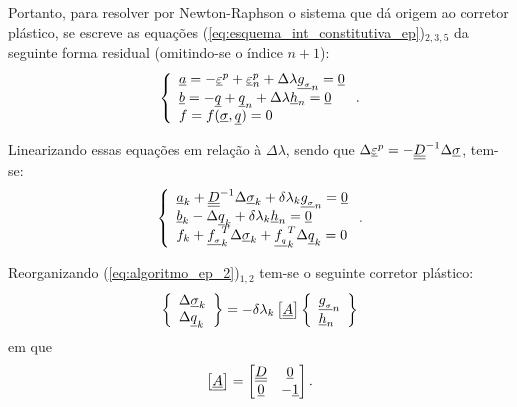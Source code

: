 Portanto, para resolver por Newton-Raphson o sistema que dá origem ao corretor plástico, se escreve as equações (\ref{eq:esquema_int_constitutiva_ep})$_{2,3,5}$ da seguinte forma residual (omitindo-se o índice $n+1$):
\begin{equation}
	\label{eq:algoritmo_ep_1}
	\left\{
	\begin{array}{lcl}
		\underline{a} = -\underline{\varepsilon}^p + \underline{\varepsilon}_n^p + \Delta \lambda \underline{g_{_\sigma}}_n = \underline{0}	\\
		\underline{b} = -\underline q + \underline q_n + \Delta\lambda\underline h_n = \underline{0} \\
		f = f(\underline \sigma,\underline q) = 0
	\end{array}
	\right..
\end{equation}

Linearizando essas equações em relação à $\Delta \lambda$, sendo que $\Delta \underline{\varepsilon}^p = - \underline{\underline D}^{-1}\Delta\underline \sigma$, tem-se:
\begin{equation}
	\label{eq:algoritmo_ep_2}
	\left\{
	\begin{array}{lcl}
		\underline{a}_k + \underline{\underline D}^{-1}\Delta\underline \sigma_k + \delta \lambda_k \underline{g_{_\sigma}}_n = \underline{0} \\
		\underline{b}_k - \Delta \underline q_k + \delta \lambda_k \underline h_n = \underline{0} \\
		f_k + \underline{f_{_\sigma}}_k^T\Delta\underline \sigma_k + \underline{f_{_q}}_k^T \Delta \underline q_k = 0
	\end{array}
	\right..
\end{equation}

Reorganizando (\ref{eq:algoritmo_ep_2})$_{1,2}$ tem-se o seguinte corretor plástico:
\begin{equation}
	\label{eq:algoritmo_ep_3}
	\left\{
	\begin{array}{lcl}
		\Delta \underline \sigma_k \\
		\Delta \underline q_k
	\end{array}
	\right\} = -\delta\lambda_k \left[ \underline{\underline A} \right]
	\left\{	
	\begin{array}{lcl}
		\underline{g_{_\sigma}}_n \\
		\underline h_n
	\end{array}
	\right\}
\end{equation}
em que
\begin{equation}
	\label{eq:Ak}
	\left[ \underline{\underline A} \right] =
	\begin{bmatrix}
		\underline{\underline D} & \underline{0} \\
		\underline{0} & -\underline{1}
	\end{bmatrix}.
\end{equation}

